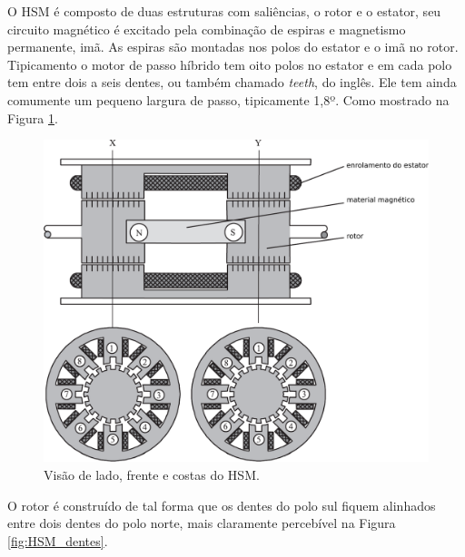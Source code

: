 O HSM é composto de duas estruturas com saliências, o rotor e o estator, seu circuito magnético é excitado pela combinação de espiras e magnetismo permanente, imã. As espiras são montadas nos polos do estator e o imã no rotor. Tipicamento o motor de passo híbrido tem oito polos no estator e em cada polo tem entre dois a seis dentes, ou também chamado \emph{teeth}, do inglês. Ele tem ainda comumente um pequeno largura de passo, tipicamente 1,8º. Como mostrado na Figura \ref{fig:estrutura_HSM}. \cite{SteppingBook}

\begin{figure}[!h]
	\centering
	\includegraphics[width = \columnwidth]{Images/estrutura_HSM.pdf}
	\caption{Visão de lado, frente e costas do HSM. \cite{SteppingBook}}
	\label{fig:estrutura_HSM}
\end{figure}

O rotor é construído de tal forma que os dentes do polo sul fiquem alinhados entre dois dentes do polo norte, mais claramente percebível na Figura \ref{fig:HSM_dentes}.

